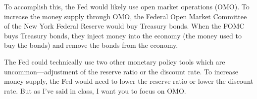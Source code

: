 \documentclass{assignment}
\begin{document}
\begin{enumerate}
\begin{solution}
To accomplish this, the Fed would likely use open market operations (OMO). To increase the money supply through OMO, the Federal Open Market Committee of the New York Federal Reserve would buy Treasury bonds. When the FOMC buys Treasury bonds, they inject money into the economy (the money used to buy the bonds) and remove the bonds from the economy.

The Fed could technically use two other monetary policy tools which are uncommon---adjustment of the reserve ratio or the discount rate. To increase money supply, the Fed would need to lower the reserve ratio or lower the discount rate. But as I've said in class, I want you to focus on OMO.
\end{solution}

\end{enumerate}
\end{document}
